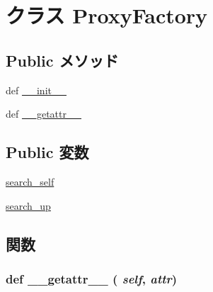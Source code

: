 \hypertarget{classm5_1_1proxy_1_1ProxyFactory}{
\section{クラス ProxyFactory}
\label{classm5_1_1proxy_1_1ProxyFactory}
}
\subsection*{Public メソッド}
\begin{DoxyCompactItemize}
\item 
def \hyperlink{classm5_1_1proxy_1_1ProxyFactory_ac775ee34451fdfa742b318538164070e}{\_\-\_\-init\_\-\_\-}
\item 
def \hyperlink{classm5_1_1proxy_1_1ProxyFactory_a0a990b3ec3889d40889daca9ee5e4695}{\_\-\_\-getattr\_\-\_\-}
\end{DoxyCompactItemize}
\subsection*{Public 変数}
\begin{DoxyCompactItemize}
\item 
\hyperlink{classm5_1_1proxy_1_1ProxyFactory_a32a4d71671dbadcd7ef6fcded5e362a7}{search\_\-self}
\item 
\hyperlink{classm5_1_1proxy_1_1ProxyFactory_ac821d07260a7b10cb5a21bd8029f22f4}{search\_\-up}
\end{DoxyCompactItemize}


\subsection{関数}
\hypertarget{classm5_1_1proxy_1_1ProxyFactory_a0a990b3ec3889d40889daca9ee5e4695}{
\subsubsection[{\_\-\_\-getattr\_\-\_\-}]{\setlength{\rightskip}{0pt plus 5cm}def \_\-\_\-getattr\_\-\_\- ( {\em self}, \/   {\em attr})}}
\label{classm5_1_1proxy_1_1ProxyFactory_a0a990b3ec3889d40889daca9ee5e4695}



